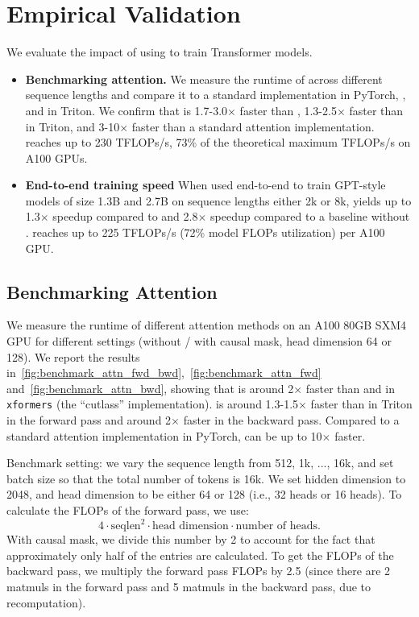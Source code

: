 \section{Empirical Validation}
\label{sec:experiments}

We evaluate the impact of using \sysname to train Transformer models.
\begin{itemize}[itemsep=0.1pt,topsep=0pt,leftmargin=*]
  \item \textbf{Benchmarking attention.}
  We measure the runtime of \sysname across different sequence lengths and
  compare it to a standard implementation in PyTorch, \sysnameone, and
  \sysnameone in Triton.
  We confirm that \sysname is 1.7-3.0$\times$ faster than \sysnameone, 1.3-2.5$\times$
  faster than \sysnameone in Triton, and 3-10$\times$ faster than a standard
  attention implementation.
  \sysname reaches up to 230 TFLOPs/s, 73\% of the theoretical maximum TFLOPs/s
  on A100 GPUs.
  \item \textbf{End-to-end training speed}
  When used end-to-end to train GPT-style models of size 1.3B and 2.7B on
  sequence lengths either 2k or 8k, \sysname yields up to 1.3$\times$ speedup compared to
  \sysnameone and 2.8$\times$ speedup compared to a baseline without \sysnameone.
  \sysname reaches up to 225 TFLOPs/s (72\% model FLOPs utilization) per A100 GPU.
\end{itemize}

\subsection{Benchmarking Attention}
\label{subsec:benchmark_attn}

We measure the runtime of different attention methods on an A100 80GB SXM4 GPU
for different settings (without / with causal mask, head dimension 64 or 128).
We report the results
in~\cref{fig:benchmark_attn_fwd_bwd},~\cref{fig:benchmark_attn_fwd}
and~\cref{fig:benchmark_attn_bwd}, showing that \sysname is around 2$\times$ faster
than \sysnameone and \sysnameone in \texttt{xformers} (the ``cutlass''
implementation).
\sysname is around 1.3-1.5$\times$ faster than \sysnameone in Triton in the forward
pass and around 2$\times$ faster in the backward pass.
Compared to a standard attention implementation in PyTorch, \sysname can be up
to 10$\times$ faster.

Benchmark setting: we vary the sequence length from 512, 1k, ..., 16k, and set
batch size so that the total number of tokens is 16k.
We set hidden dimension to 2048, and head dimension to be either 64 or 128
(i.e., 32 heads or 16 heads).
To calculate the FLOPs of the forward pass, we use:
\begin{equation*}
  4 \cdot \text{seqlen}^2 \cdot \text{head dimension} \cdot \text{number of heads}.
\end{equation*}
With causal mask, we divide this number by 2 to account for the fact that
approximately only half of the entries are calculated.
To get the FLOPs of the backward pass, we multiply the forward pass FLOPs by 2.5
(since there are 2 matmuls in the forward pass and 5 matmuls in the backward
pass, due to recomputation).

